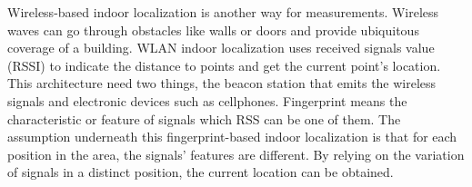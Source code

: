 \documentclass[../UNBThesis2.tex]{subfiles}
\begin{document}
Wireless-based indoor localization is another way for measurements. Wireless waves can go through obstacles like walls or doors and provide ubiquitous coverage of a building. WLAN indoor localization uses received signals value (RSSI) to indicate the distance to points and get the current point's location.
This architecture need two things, the beacon station that emits the wireless signals and electronic devices such as cellphones. 
Fingerprint means the characteristic or feature of signals which RSS can be one of them. The assumption underneath this fingerprint-based indoor localization is that for each position in the area, the signals' features are different. By relying on the variation of signals in a distinct position, the current location can be obtained.







\end{document}
